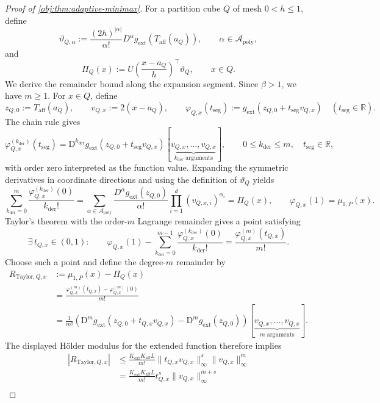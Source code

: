 \documentclass[11pt]{article}
\begin{document}
\begin{proof}[Proof of \cref{obj:thm:adaptive-minimax}]
For a partition cube \(Q\) of mesh \(0<h\le1\), define
\[
\vartheta_{Q,\alpha}
:=
\frac{(2h)^{|\alpha|}}{\alpha!}
D^\alpha g_{\mathrm{ext}}(T_{\mathrm{aff}}(a_Q)),
\qquad \alpha\in\mathcal A_{\mathrm{poly}},
\]
and
\[
\Pi_Q(x)
:=
U\!\left(\frac{x-a_Q}{h}\right)^\top\vartheta_Q,
\qquad x\in Q.
\]
We derive the remainder bound along the expansion segment. Since \(\beta>1\), we have \(m\ge1\). For \(x\in Q\), define
\[
z_{Q,0}:=T_{\mathrm{aff}}(a_Q),
\qquad
v_{Q,x}:=2(x-a_Q),
\qquad
\varphi_{Q,x}(t_{\mathrm{seg}})
:=g_{\mathrm{ext}}(z_{Q,0}+t_{\mathrm{seg}}v_{Q,x})
\quad(t_{\mathrm{seg}}\in\mathbb R).
\]
The chain rule gives
\[
\varphi_{Q,x}^{(k_{\mathrm{der}})}(t_{\mathrm{seg}})
=
\mathrm D^{k_{\mathrm{der}}}g_{\mathrm{ext}}
(z_{Q,0}+t_{\mathrm{seg}}v_{Q,x})
[\underbrace{v_{Q,x},\ldots,v_{Q,x}}_{k_{\mathrm{der}}\text{ arguments}}],
\qquad
0\le k_{\mathrm{der}}\le m,
\quad t_{\mathrm{seg}}\in\mathbb R,
\]
with order zero interpreted as the function value. Expanding the symmetric derivatives in coordinate directions and using the definition of \(\vartheta_Q\) yields
\[
\sum_{k_{\mathrm{der}}=0}^{m}
\frac{\varphi_{Q,x}^{(k_{\mathrm{der}})}(0)}{k_{\mathrm{der}}!}
=
\sum_{\alpha\in\mathcal A_{\mathrm{poly}}}
\frac{D^\alpha g_{\mathrm{ext}}(z_{Q,0})}{\alpha!}
\prod_{i=1}^{d}(v_{Q,x,i})^{\alpha_i}
=\Pi_Q(x),
\qquad
\varphi_{Q,x}(1)=\mu_{1,P}(x).
\]
Taylor's theorem with the order-\(m\) Lagrange remainder gives a point satisfying
\[
\exists\,t_{Q,x}\in(0,1):\qquad
\varphi_{Q,x}(1)
-
\sum_{k_{\mathrm{der}}=0}^{m-1}
\frac{\varphi_{Q,x}^{(k_{\mathrm{der}})}(0)}{k_{\mathrm{der}}!}
=
\frac{\varphi_{Q,x}^{(m)}(t_{Q,x})}{m!}.
\]
Choose such a point and define the degree-\(m\) remainder by
\[
\begin{aligned}
R_{\mathrm{Taylor},Q,x}
&:=\mu_{1,P}(x)-\Pi_Q(x)\\
&=\frac{\varphi_{Q,x}^{(m)}(t_{Q,x})
-\varphi_{Q,x}^{(m)}(0)}{m!}\\
&=\frac1{m!}
\left(
\mathrm D^m g_{\mathrm{ext}}(z_{Q,0}+t_{Q,x}v_{Q,x})
-\mathrm D^m g_{\mathrm{ext}}(z_{Q,0})
\right)
[\underbrace{v_{Q,x},\ldots,v_{Q,x}}_{m\text{ arguments}}].
\end{aligned}
\]
The displayed Hölder modulus for the extended function therefore implies
\[
\begin{aligned}
|R_{\mathrm{Taylor},Q,x}|
&\le
\frac{K_{\mathrm{ext}}K_{\mathrm{aff}}L}{m!}
\|t_{Q,x}v_{Q,x}\|_\infty^s
\|v_{Q,x}\|_\infty^m\\
&=
\frac{K_{\mathrm{ext}}K_{\mathrm{aff}}L}{m!}
 t_{Q,x}^{s}\|v_{Q,x}\|_\infty^{m+s}\\

\end{aligned}\]
\end{proof}
\end{document}
